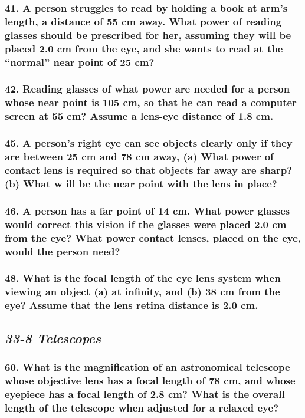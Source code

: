 \documentclass{article}
\begin{document}
\subsubsection*{
    41. A person struggles to read by holding a book at arm’s length, a distance of 55 cm away. What power of
    reading glasses should be prescribed for her, assuming they will be placed 2.0 cm from the eye, and she
    wants to read at the “normal” near point of 25 cm?
}
\subsubsection*{
    42. Reading glasses of what power are needed for a person whose near point is 105 cm, so that he can read
    a computer screen at 55 cm? Assume a lens-eye distance of 1.8 cm.
}
\subsubsection*{
    45. A person’s right eye can see objects clearly only if they are between 25 cm and 78 cm away, (a) What
    power of contact lens is required so that objects far away are sharp? (b) What w ill be the near point
    with the lens in place? 
}
\subsubsection*{
    46. A person has a far point of 14 cm. What power glasses would correct this vision if the glasses were
    placed 2.0 cm from the eye? What power contact lenses, placed on the eye, would the person need?
}
\subsubsection*{
    48. What is the focal length of the eye lens system when viewing an object (a) at infinity, and (b) 38 cm
    from the eye? Assume that the lens retina distance is 2.0 cm.
}
\newpage
\begin{center}
    \subsection*{\textbf{\textit{33-8 Telescopes}}}
\end{center}
\subsubsection*{
    60. What is the magnification of an astronomical telescope whose objective lens has a focal length of 78 cm,
    and whose eyepiece has a focal length of 2.8 cm? What is the overall length of the telescope when adjusted
    for a relaxed eye?
}
\end{document}
